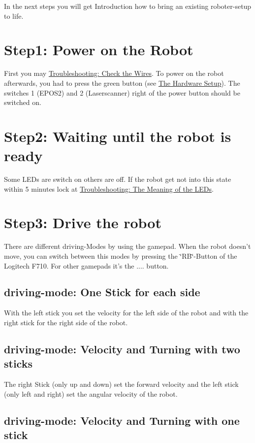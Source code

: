 In the next steps you will get Introduction how to bring an existing roboter-\/setup to life.\hypertarget{page1_step1}{}\section{Step1\-: Power on the Robot}\label{page1_step1}
First you may \hyperlink{page1_checkWires}{Troubleshooting\-: Check the Wires}. To power on the robot afterwards, you had to press the green button (see \hyperlink{index_hw_setup}{The Hardware Setup}). The switches 1 (E\-P\-O\-S2) and 2 (Laserscanner) right of the power button should be switched on.\hypertarget{page1_step2}{}\section{Step2\-: Waiting until the robot is ready}\label{page1_step2}
Some L\-E\-Ds are switch on others are off. If the robot get not into this state within 5 minutes lock at \hyperlink{page1_checkLEDs}{Troubleshooting\-: The Meaning of the L\-E\-Ds}.\hypertarget{page1_step3}{}\section{Step3\-: Drive the robot}\label{page1_step3}
There are different driving-\/\-Modes by using the gamepad. When the robot doesn't move, you can switch between this modes by pressing the \char`\"{}\-R\-B\char`\"{}-\/\-Button of the Logitech F710. For other gamepads it's the .... button.\hypertarget{page1_mode_tank}{}\subsection{driving-\/mode\-: One Stick for each side}\label{page1_mode_tank}
With the left stick you set the velocity for the left side of the robot and with the right stick for the right side of the robot.\hypertarget{page1_mode_twostick}{}\subsection{driving-\/mode\-: Velocity and Turning with two sticks}\label{page1_mode_twostick}
The right Stick (only up and down) set the forward velocity and the left stick (only left and right) set the angular velocity of the robot.\hypertarget{page1_mode_onestick}{}\subsection{driving-\/mode\-: Velocity and Turning with one stick}\label{page1_mode_onestick}
